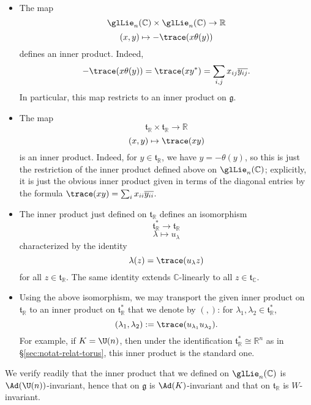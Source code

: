\documentclass[reqno]{amsart} 
\begin{document}
\begin{itemize}
\item The map
  \begin{equation*}
    \glLie_n(\mathbb{C}) \times \glLie_n(\mathbb{C}) \rightarrow \mathbb{R}
  \end{equation*}
  \begin{equation*}
    (x,y) \mapsto - \trace(x \theta(y))
  \end{equation*}
  defines an inner product.  Indeed,
  \begin{equation*}
    - \trace(x \theta(y)) = \trace(x y^*) = \sum_{i,j} x_{i j} \overline{y_{i j}}.
  \end{equation*}
  In particular, this map restricts to an inner product on $\mathfrak{g}$.
\item The map
  \begin{equation*}
    \mathfrak{t}_{\mathbb{R}} \times \mathfrak{t}_{\mathbb{R}} \rightarrow \mathbb{R}
  \end{equation*}
  \begin{equation*}
    (x,y) \mapsto \trace( x y)
  \end{equation*}
  is an inner product.  Indeed, for $y \in \mathfrak{t}_{\mathbb{R}}$, we have $y = - \theta(y)$, so this is just the restriction of the inner product defined above on $\glLie_n(\mathbb{C})$; explicitly, it is just the obvious inner product given in terms of the diagonal entries by the formula $\trace(x y) = \sum_{i} x_{i i} \overline{y_{i i}}$.
\item The inner product just defined on $\mathfrak{t}_{\mathbb{R}}$ defines an isomorphism
  \begin{equation*}
    \mathfrak{t}_{\mathbb{R}}^* \rightarrow \mathfrak{t}_{\mathbb{R}}
  \end{equation*}
  \begin{equation*}
    \lambda \mapsto u_\lambda
  \end{equation*}
  characterized by the identity
  \begin{equation}\label{eq:characterize-u-lambda}
    \lambda(z) = \trace(u_\lambda z)
  \end{equation}
  for all $z \in \mathfrak{t}_{\mathbb{R}}$.  The same identity extends $\mathbb{C}$-linearly to all $z \in \mathfrak{t}_{\mathbb{C}}$.
\item Using the above isomorphism, we may transport the given inner product on $\mathfrak{t}_{\mathbb{R}}$ to an inner product on $\mathfrak{t}_{\mathbb{R}}^*$ that we denote by $(,)$: for $\lambda_1, \lambda_2 \in \mathfrak{t}_{\mathbb{R}}^*$,
  \begin{equation*}
    (\lambda_1, \lambda_2) := \trace(u_{\lambda_1} u_{\lambda_2}).
  \end{equation*}
  For example, if $K = \U(n)$, then under the identification $\mathfrak{t}_{\mathbb{R}}^* \cong \mathbb{R}^n$ as in \S\ref{sec:notat-relat-torus}, this inner product is the standard one.
\end{itemize}
We verify readily that the inner product that we defined on $\glLie_n(\mathbb{C})$ is $\Ad(\U(n))$-invariant, hence that on $\mathfrak{g}$ is $\Ad(K)$-invariant and that on $\mathfrak{t}_{\mathbb{R}}$ is $W$-invariant.
\end{document}

